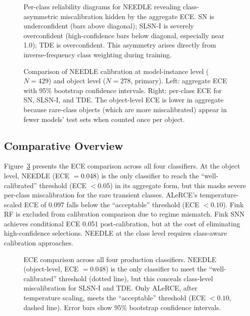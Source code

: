 \documentclass[twocolumn]{aastex631}
\begin{document}
\begin{figure}
\caption{Per-class reliability diagrams for NEEDLE revealing class-asymmetric miscalibration hidden by the aggregate ECE. SN is underconfident (bars above diagonal); SLSN-I is severely overconfident (high-confidence bars below diagonal, especially near 1.0); TDE is overconfident. This asymmetry arises directly from inverse-frequency class weighting during training. \label{fig:needle_perclass}}
\end{figure}

\begin{figure}
\caption{Comparison of NEEDLE calibration at model-instance level ($N = 429$) and object level ($N = 278$, primary). Left: aggregate ECE with 95\% bootstrap confidence intervals. Right: per-class ECE for SN, SLSN-I, and TDE. The object-level ECE is lower in aggregate because rare-class objects (which are more miscalibrated) appear in fewer models' test sets when counted once per object. \label{fig:needle_comparison}}
\end{figure}

\subsection{Comparative Overview}

Figure~\ref{fig:summary} presents the ECE comparison across all four classifiers. At the object level, NEEDLE (ECE $= 0.048$) is the only classifier to reach the ``well-calibrated'' threshold (ECE $< 0.05$) in its aggregate form, but this masks severe per-class miscalibration for the rare transient classes. ALeRCE's temperature-scaled ECE of 0.097 falls below the ``acceptable'' threshold (ECE $< 0.10$). Fink RF is excluded from calibration comparison due to regime mismatch. Fink SNN achieves conditional ECE 0.051 post-calibration, but at the cost of eliminating high-confidence selections. NEEDLE at the class level requires class-aware calibration approaches.

\begin{figure}
\caption{ECE comparison across all four production classifiers. NEEDLE (object-level, ECE $= 0.048$) is the only classifier to meet the ``well-calibrated'' threshold (dotted line), but this conceals class-level miscalibration for SLSN-I and TDE. Only ALeRCE, after temperature scaling, meets the ``acceptable'' threshold (ECE $< 0.10$, dashed line). Error bars show 95\% bootstrap confidence intervals. \label{fig:summary}}
\end{figure}
\end{document}
